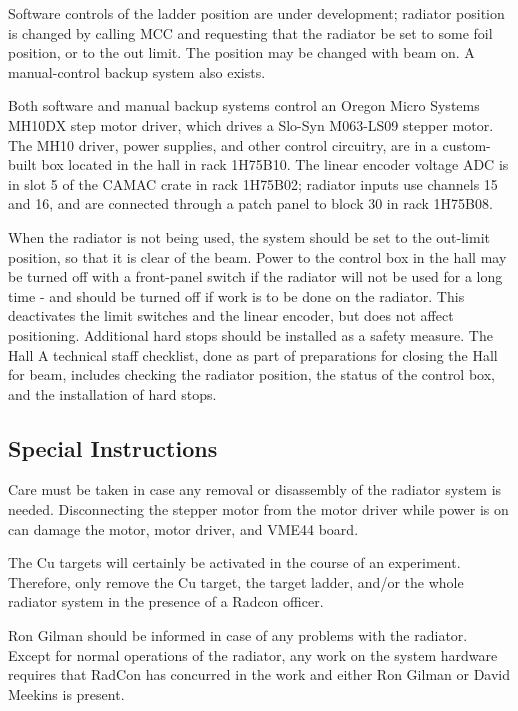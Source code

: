 Software controls of the ladder position are under development;
radiator position is changed by calling
MCC and requesting that the radiator be set to some foil position,
or to the out limit.
The position may be changed with beam on.
A manual-control backup system also exists.

Both software and manual backup systems
control an Oregon Micro Systems MH10DX step motor driver,
which drives a Slo-Syn M063-LS09 stepper motor.
The MH10 driver, power supplies, and other control circuitry, 
are in a custom-built box located in the hall in rack 1H75B10.
The linear encoder voltage ADC is in slot 5 of the CAMAC crate in 
rack 1H75B02; radiator inputs use channels 15 and 16, and
are connected through a patch panel to block 30 in rack 1H75B08.

When the radiator is not being used, the system should be set to the
out-limit position, so that it is clear of the beam.
Power to the control box in the hall may be turned off with a front-panel 
switch if the radiator will not be used for a long time - and should be 
turned off if work is to be done on the radiator.
This deactivates the limit switches and the linear encoder, 
but does not affect positioning.
Additional hard stops should be installed as a safety measure.
The Hall A technical staff checklist, done as part of preparations for
closing the Hall for beam, includes checking the radiator
position, the status of the control box, and the installation of hard stops.

\subsection{Special Instructions}

Care must be taken in case any removal or disassembly of the radiator
system is needed.
Disconnecting the stepper motor from the motor driver
while power is on can damage the motor, motor driver, and VME44 board.

The Cu targets will certainly be activated in the course of an experiment.
Therefore, only remove the Cu target, the target ladder,
and/or the whole radiator system in the presence of a Radcon officer.

Ron Gilman should be informed in case of any problems with the radiator.
Except for normal operations of the radiator, any work on the
system hardware requires that RadCon has concurred in the work and
either Ron Gilman or David Meekins is present.


%

